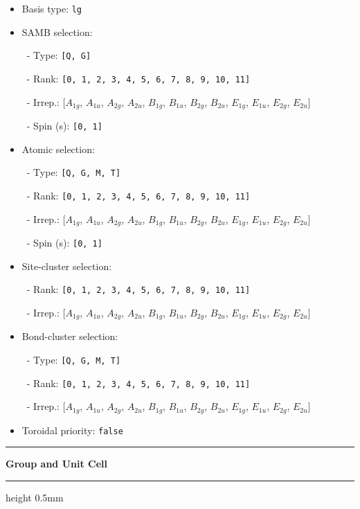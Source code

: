 \documentclass[fleqn,10pt,landscape]{jsarticle}
\begin{document}
\begin{itemize}
\item Basis type: \texttt{lg}

\item SAMB selection:

\, - Type: \texttt{[Q, G]}

\, - Rank: \texttt{[0, 1, 2, 3, 4, 5, 6, 7, 8, 9, 10, 11]}

\, - Irrep.: [$A_{1g}$, $A_{1u}$, $A_{2g}$, $A_{2u}$, $B_{1g}$, $B_{1u}$, $B_{2g}$, $B_{2u}$, $E_{1g}$, $E_{1u}$, $E_{2g}$, $E_{2u}$]

\, - Spin (s): \texttt{[0, 1]}

\item Atomic selection:

\, - Type: \texttt{[Q, G, M, T]}

\, - Rank: \texttt{[0, 1, 2, 3, 4, 5, 6, 7, 8, 9, 10, 11]}

\, - Irrep.: [$A_{1g}$, $A_{1u}$, $A_{2g}$, $A_{2u}$, $B_{1g}$, $B_{1u}$, $B_{2g}$, $B_{2u}$, $E_{1g}$, $E_{1u}$, $E_{2g}$, $E_{2u}$]

\, - Spin (s): \texttt{[0, 1]}

\item Site-cluster selection:

\, - Rank: \texttt{[0, 1, 2, 3, 4, 5, 6, 7, 8, 9, 10, 11]}

\, - Irrep.: [$A_{1g}$, $A_{1u}$, $A_{2g}$, $A_{2u}$, $B_{1g}$, $B_{1u}$, $B_{2g}$, $B_{2u}$, $E_{1g}$, $E_{1u}$, $E_{2g}$, $E_{2u}$]

\item Bond-cluster selection:

\, - Type: \texttt{[Q, G, M, T]}

\, - Rank: \texttt{[0, 1, 2, 3, 4, 5, 6, 7, 8, 9, 10, 11]}

\, - Irrep.: [$A_{1g}$, $A_{1u}$, $A_{2g}$, $A_{2u}$, $B_{1g}$, $B_{1u}$, $B_{2g}$, $B_{2u}$, $E_{1g}$, $E_{1u}$, $E_{2g}$, $E_{2u}$]

\item Toroidal priority: \texttt{false}

\end{itemize}
\vspace{5mm}
\noindent \rule[0.5mm]{5mm}{0.5mm}\hspace{3mm}\textbf{Group and Unit Cell}\hspace{3mm}\leaders\hrule height 0.5mm\hfill\kern0pt
\vspace{3mm}
\end{document}
